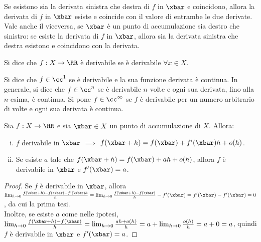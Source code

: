 \documentclass[11pt]{article}
\begin{document}
	\begin{remark}\nl
		\li Se esistono sia la derivata sinistra che destra di $f$ in $\xbar$
		e coincidono, allora la derivata di $f$ in $\xbar$ esiste e
		coincide con il valore di entrambe le due derivate. \\
		\li Vale anche il viceversa, se $\xbar$ è un punto di accumulazione
		sia destro che sinistro: se esiste la derivata di $f$ in $\xbar$,
		allora sia la derivata sinistra che destra esistono e coincidono
		con la derivata.
	\end{remark}

	\begin{definition}
		Si dice che $f : X \to \RR$ è derivabile se è derivabile $\forall x \in X$.
	\end{definition}
	
	\begin{definition}
		Si dice che $f \in \cc^1$ se è derivabile e la sua
		funzione derivata è continua. In generale, si dice che $f \in \cc^n$ se
		è derivabile $n$ volte e ogni sua derivata, fino alla $n$-esima,
		è continua. Si pone $f \in \cc^\infty$ se $f$ è derivabile per un
		numero arbitrario di volte e ogni sua derivata è continua.
	\end{definition}

	\begin{proposition}
		Sia $f : X \to \RR$ e sia $\xbar \in X$ un punto di accumulazione di $X$. Allora:
		
		\begin{enumerate}[(i)]
			\item $f$ derivabile in $\xbar$ $\implies$ $f(\xbar + h) = f(\xbar) + f'(\xbar) h + o(h)$.
			\item Se esiste $a$ tale che $f(\xbar + h) = f(\xbar) + ah + o(h)$,
			allora $f$ è derivabile in $\xbar$ e $f'(\xbar) = a$.
		\end{enumerate}
	\end{proposition}

	\begin{proof}
		Se $f$ è derivabile in $\xbar$, allora $\lim_{h \to 0} \frac{f(\xbar + h) - f(\xbar) - f'(\xbar) h}{h} = \lim_{h \to 0} \frac{f(\xbar + h) - f(\xbar)}{h} - f'(\xbar) = f'(\xbar) - f'(\xbar) = 0$, da cui la prima tesi. \\
		
		Inoltre, se esiste $a$ come nelle ipotesi, $\lim_{h \to 0} \frac{f(\xbar + h) - f(\xbar)}{h} =\lim_{h \to 0} \frac{ah + o(h)}{h} = a + \lim_{h \to 0} \frac{o(h)}{h} = a + 0 = a$, quindi $f$ è derivabile in $\xbar$ e $f'(\xbar) = a$.
	\end{proof}
\end{document}
